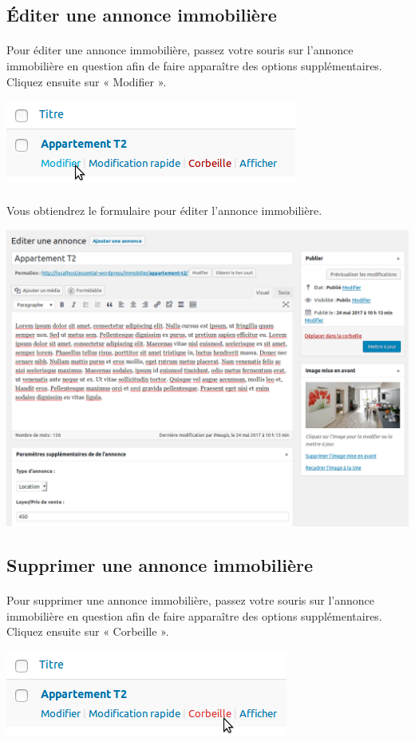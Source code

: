 \documentclass[10pt,a4paper]{article}
\begin{document}
\subsection{Éditer une annonce immobilière}
\paragraph{}Pour éditer une annonce immobilière, passez votre souris sur l’annonce immobilière en question afin de faire apparaître des options supplémentaires. Cliquez ensuite sur « Modifier ».
\begin{center}
\includegraphics[scale=0.3]{img/0319.png}
\end{center}
\paragraph{}Vous obtiendrez le formulaire pour éditer l'annonce immobilière.
\begin{center}
\includegraphics[scale=0.2]{img/0320.png}
\end{center}
\newpage
\subsection{Supprimer une annonce immobilière}
\paragraph{}Pour supprimer une annonce immobilière, passez votre souris sur l’annonce immobilière en question afin de faire apparaître des options supplémentaires. Cliquez ensuite sur « Corbeille ».
\begin{center}
\includegraphics[scale=0.3]{img/0321.png}
\end{center}
\end{document}
